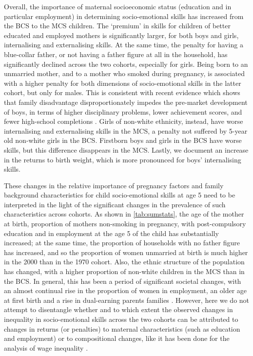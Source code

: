 Overall, the importance of maternal socioeconomic status (education and in particular employment) in determining socio-emotional skills has increased from the BCS to the MCS children. The `premium' in skills for children of better educated and employed mothers is significantly larger, for both boys and girls, internalising and externalising skills. At the same time, the penalty for having a blue-collar father, or not having a father figure at all in the household, has significantly declined across the two cohorts, especially for girls. Being born to an unmarried mother, and to a mother who smoked during pregnancy, is associated with a higher penalty for both dimensions of socio-emotional skills in the latter cohort, but only for males. This is consistent with recent evidence which shows that family disadvantage disproportionately impedes the pre-market development of boys, in terms of higher disciplinary problems, lower achievement scores, and fewer high-school completions \citep{Autor2016a}. Girls of non-white ethnicity, instead, have worse internalising and externalising skills in the MCS, a penalty not suffered by 5-year old non-white girls in the BCS. Firstborn boys and girls in the BCS have worse skills, but this difference disappears in the MCS. Lastly, we document an increase in the returns to birth weight, which is more pronounced for boys' internalising skills.

These changes in the relative importance of pregnancy factors and family background characteristics for child socio-emotional skills at age 5 need to be interpreted in the light of the significant changes in the prevalence of such characteristics across cohorts. As shown in \autoref{tab:sumstats}, the age of the mother at birth, proportion of mothers non-smoking in pregnancy, with post-compulsory education and in employment at the age 5 of the child has substantially increased; at the same time, the proportion of households with no father figure has increased, and so the proportion of women unmarried at birth is much higher in the 2000 than in the 1970 cohort. Also, the ethnic structure of the population has changed, with a higher proportion of non-white children in the MCS than in the BCS. In general, this has been a period of significant societal changes, with an almost continual rise in the proportion of women in employment, an older age at first birth and a rise in dual-earning parents families \citep{Roantree2018}. However, here we do not attempt to disentangle whether and to which extent the observed changes in inequality in socio-emotional skills across the two cohorts can be attributed to changes in returns (or penalties) to maternal characteristics (such as education and employment) or to compositional changes, like it has been done for the analysis of wage inequality \citep{Blundell2007}.

